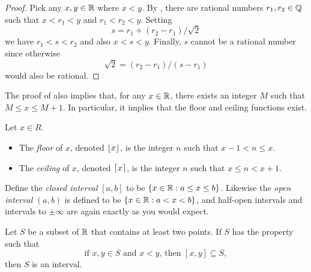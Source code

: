 \begin{proof}
  Pick any $x, y \in \mathbb R$ where $x < y$. By ,
  there are rational numbers $r_1, r_2 \in \mathbb Q$ such that $x < r_1 <
  y$ and  $r_1 < r_2 < y$. Setting
  \[ s = r_1 + (r_2 - r_1) / \sqrt{2} \]
  we have $r_1 < s < r_2$ and also $x < s < y$. Finally, $s$ cannot
  be a rational number since otherwise
  \[ \sqrt{2} = (r_2 - r_1) / (s - r_1) \]
  would also be rational.
\end{proof}

\begin{remark}
  The proof of  also implies
  that, for any $x \in \mathbb R$, there exists an integer $M$ such that $M
  \leq x \leq M + 1$. In particular, it implies that the floor and
  ceiling functions exist.
\end{remark}

\begin{definition}
  Let $x \in R$.
  \begin{itemize}
    \item The \textit{floor} of $x$, denoted $\lfloor x \rfloor$, is the
      integer $n$ such that $x  - 1 < n \leq x$.
    \item The \textit{ceiling} of $x$, denoted $\lceil x \rceil$, is the
      integer $n$ such that $x \leq n < x + 1$.
  \end{itemize}
\end{definition}

\begin{definition}
  Define the \textit{closed interval} $[a, b]$ to be $\{ x \in \mathbb R
  : a \leq x \leq b \}$. Likewise the \textit{open interval} $(a, b)$
  is defined to be $\{ x \in \mathbb R : a < x < b \}$, and half-open
  intervals and intervals to $\pm\infty$ are again exactly as you would expect.
\end{definition}

\begin{theorem}
  Let $S$ be a subset of $\mathbb R$ that contains at least two points. If
  $S$ has the property such that
  \[ \text{if $x, y \in S$ and $x < y$, then $[x, y] \subseteq S$}, \tag{1} \]
  then $S$ is an interval.
\end{theorem}

